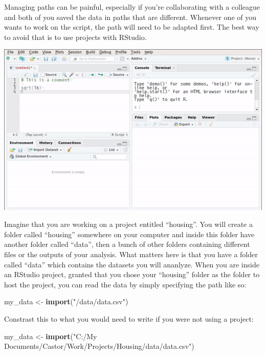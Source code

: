 \documentclass[]{gitbook}
\newenvironment{Shaded}{\begin{snugshade}}{\end{snugshade}}
\newcommand{\KeywordTok}[1]{\textcolor[rgb]{0.13,0.29,0.53}{\textbf{#1}}}
\newcommand{\NormalTok}[1]{#1}
\newcommand{\StringTok}[1]{\textcolor[rgb]{0.31,0.60,0.02}{#1}}
\theoremstyle{definition}
\theoremstyle{definition}
\theoremstyle{definition}
\theoremstyle{remark}
\begin{document}
Managing paths can be painful, especially if you're collaborating with a
colleague and both of you saved the data in paths that are different.
Whenever one of you wants to work on the script, the path will need to
be adapted first. The best way to avoid that is to use projects with
RStudio.

\includegraphics{pics/rstudio_projects.gif}

Imagine that you are working on a project entitled ``housing''. You will
create a folder called ``housing'' somewhere on your computer and inside
this folder have another folder called ``data'', then a bunch of other
folders containing different files or the outputs of your analysis. What
matters here is that you have a folder called ``data'' which contains
the datasets you will ananlyze. When you are inside an RStudio project,
granted that you chose your ``housing'' folder as the folder to host the
project, you can read the data by simply specifying the path like so:

\begin{Shaded}
\begin{Highlighting}[]
\NormalTok{my_data <-}\StringTok{ }\KeywordTok{import}\NormalTok{(}\StringTok{"/data/data.csv"}\NormalTok{)}
\end{Highlighting}
\end{Shaded}

Constrast this to what you would need to write if you were not using a
project:

\begin{Shaded}
\begin{Highlighting}[]
\NormalTok{my_data <-}\StringTok{ }\KeywordTok{import}\NormalTok{(}\StringTok{"C:/My Documents/Castor/Work/Projects/Housing/data/data.csv"}\NormalTok{)}
\end{Highlighting}
\end{Shaded}
\end{document}
